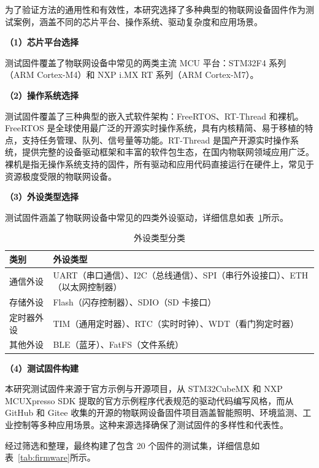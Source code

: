 为了验证方法的通用性和有效性，本研究选择了多种典型的物联网设备固件作为测试案例，涵盖不同的芯片平台、操作系统、驱动复杂度和应用场景。

\textbf{（1）芯片平台选择}

测试固件覆盖了物联网设备中常见的两类主流 MCU 平台：STM32F4 系列（ARM Cortex-M4）和 NXP i.MX RT 系列（ARM Cortex-M7）。

\textbf{（2）操作系统选择}

测试固件覆盖了三种典型的嵌入式软件架构：FreeRTOS、RT-Thread 和裸机。FreeRTOS 是全球使用最广泛的开源实时操作系统，具有内核精简、易于移植的特点，支持任务管理、队列、信号量等功能。RT-Thread 是国产开源实时操作系统，提供完整的设备驱动框架和丰富的软件包生态，在国内物联网领域应用广泛。裸机是指无操作系统支持的固件，所有驱动和应用代码直接运行在硬件上，常见于资源极度受限的物联网设备。

\textbf{（3）外设类型选择}

测试固件涵盖了物联网设备中常见的四类外设驱动，详细信息如表~\ref{tab:peripherals}所示。

\begin{table}[htbp]
\centering
\caption{外设类型分类}
\label{tab:peripherals}
\begin{tabular}{ll}
\toprule
\textbf{类别} & \textbf{外设类型} \\
\midrule
通信外设 & UART（串口通信）、I2C（总线通信）、SPI（串行外设接口）、ETH（以太网控制器） \\
存储外设 & Flash（闪存控制器）、SDIO（SD 卡接口） \\
定时器外设 & TIM（通用定时器）、RTC（实时时钟）、WDT（看门狗定时器） \\
其他外设 & BLE（蓝牙）、FatFS（文件系统） \\
\bottomrule
\end{tabular}
\end{table}

\textbf{（4）测试固件构建}

本研究测试固件来源于官方示例与开源项目，从 STM32CubeMX 和 NXP MCUXpresso SDK 提取的官方示例程序代表规范的驱动代码编写风格，而从 GitHub 和 Gitee 收集的开源的物联网设备固件项目涵盖智能照明、环境监测、工业控制等多种应用场景。这种来源选择确保了测试固件的多样性和代表性。

经过筛选和整理，最终构建了包含 20 个固件的测试集，详细信息如表~\ref{tab:firmware}所示。

